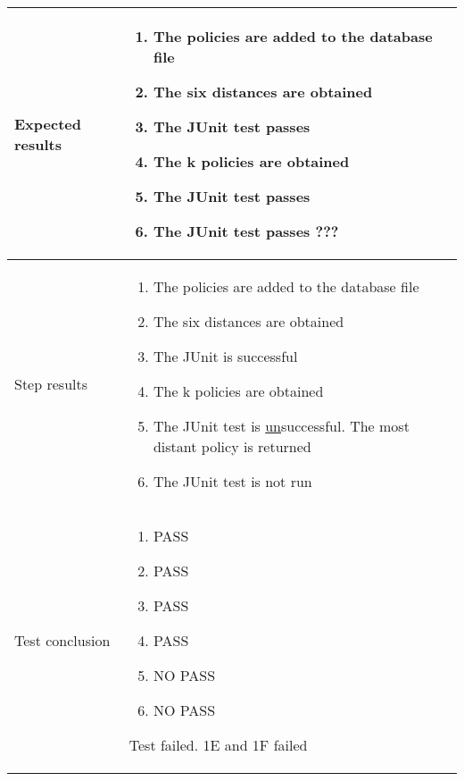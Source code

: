 \documentclass[a4paper]{article}
\begin{document}
\begin{center}
\begin{tabular}{ |  p{3cm} | p{7cm} | }
			Expected results &	\begin{enumerate}
							\item The policies are added to the database file
							\item The six distances are obtained
							\item The JUnit test passes
							\item The k policies are obtained
							\item The JUnit test passes
							\item The JUnit test passes ???
						\end{enumerate}
							 \\  [5pt] \hline

			Step results & 	\begin{enumerate}
							\item The policies are added to the database file
							\item The six distances are obtained
							\item The JUnit is successful
							\item The k policies are obtained
							\item The JUnit test is \underline{un}successful. The most distant policy is returned
							\item The JUnit test is not run
						\end{enumerate}
							 \\  [5pt] \hline

			Test conclusion & 	\begin{enumerate}
							\item PASS
							\item PASS
							\item PASS
							\item PASS
							\item NO PASS
							\item NO PASS
						\end{enumerate}
						Test failed. 1E and 1F failed \\  [5pt] \hline
		\end{tabular}
	\end{center}
\end{document}
